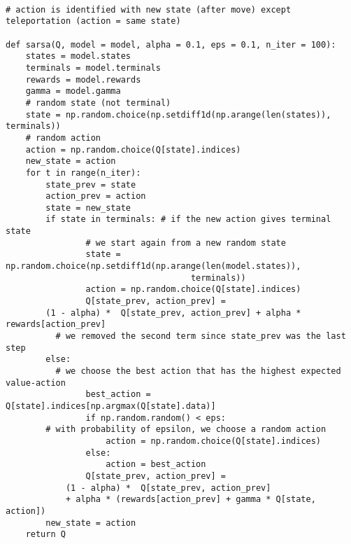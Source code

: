 \lstset{language=Python}
\lstset{frame=lines}
\lstset{basicstyle=\footnotesize}
\begin{lstlisting}

# action is identified with new state (after move) except teleportation (action = same state)

def sarsa(Q, model = model, alpha = 0.1, eps = 0.1, n_iter = 100):
    states = model.states
    terminals = model.terminals
    rewards = model.rewards
    gamma = model.gamma
    # random state (not terminal)
    state = np.random.choice(np.setdiff1d(np.arange(len(states)), terminals))
    # random action
    action = np.random.choice(Q[state].indices)
    new_state = action
    for t in range(n_iter):
        state_prev = state
        action_prev = action
        state = new_state
        if state in terminals: # if the new action gives terminal state
            	# we start again from a new random state
	            state = np.random.choice(np.setdiff1d(np.arange(len(model.states)),
									 terminals))
	            action = np.random.choice(Q[state].indices)
	            Q[state_prev, action_prev] = 
		(1 - alpha) *  Q[state_prev, action_prev] + alpha * rewards[action_prev]
		  # we removed the second term since state_prev was the last step
        else:
		  # we choose the best action that has the highest expected value-action
	            best_action = Q[state].indices[np.argmax(Q[state].data)]
	            if np.random.random() < eps: 
		# with probability of epsilon, we choose a random action
	                action = np.random.choice(Q[state].indices)
	            else:
	                action = best_action
	            Q[state_prev, action_prev] = 
			(1 - alpha) *  Q[state_prev, action_prev] 
			+ alpha * (rewards[action_prev] + gamma * Q[state, action])
        new_state = action
    return Q

\end{lstlisting}

\vspace{5mm}